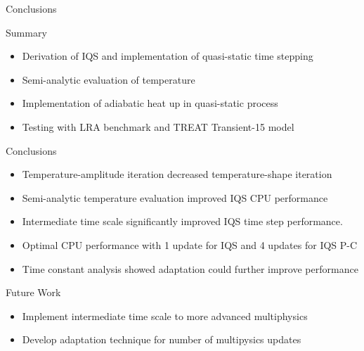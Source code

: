 \documentclass[8pt,xcolor=dvipnames]{beamer}
\begin{document}
\begin{frame}{Conclusions}
\vspace{-3mm}

\begin{block}{Summary}
\begin{itemize}
\item Derivation of IQS and implementation of quasi-static time stepping
\item Semi-analytic evaluation of temperature
\item Implementation of adiabatic heat up in quasi-static process
\item Testing with LRA benchmark and TREAT Transient-15 model
\end{itemize}
\end{block}

\begin{block}{Conclusions}
\begin{itemize}
\item Temperature-amplitude iteration decreased temperature-shape iteration
\item Semi-analytic temperature evaluation improved IQS CPU performance
\item Intermediate time scale significantly improved IQS time step performance.
\item Optimal CPU performance with 1 update for IQS and 4 updates for IQS P-C
\item Time constant analysis showed adaptation could further improve performance
\end{itemize}
\end{block}

\begin{block}{Future Work}
\begin{itemize}
\item Implement intermediate time scale to more advanced multiphysics
\item Develop adaptation technique for number of multipysics updates
\end{itemize}
\end{block}

\end{frame}
\end{document}
